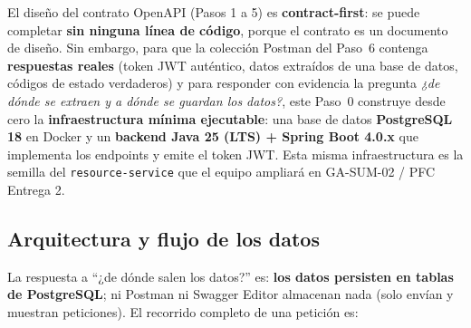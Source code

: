 \documentclass[11pt,a4paper]{article}
\begin{document}
\begin{cajanota}
El diseño del contrato OpenAPI (Pasos 1 a 5) es \textbf{contract-first}: se puede completar \textbf{sin ninguna línea de código}, porque el contrato es un documento de diseño. Sin embargo, para que la colección Postman del Paso~6 contenga \textbf{respuestas reales} (token JWT auténtico, datos extraídos de una base de datos, códigos de estado verdaderos) y para responder con evidencia la pregunta \textit{¿de dónde se extraen y a dónde se guardan los datos?}, este Paso~0 construye desde cero la \textbf{infraestructura mínima ejecutable}: una base de datos \textbf{PostgreSQL 18} en Docker y un \textbf{backend Java 25 (LTS) + Spring Boot 4.0.x} que implementa los endpoints y emite el token JWT. Esta misma infraestructura es la semilla del \texttt{resource-service} que el equipo ampliará en GA-SUM-02 / PFC Entrega 2.
\end{cajanota}

\subsection{Arquitectura y flujo de los datos}

La respuesta a ``¿de dónde salen los datos?'' es: \textbf{los datos persisten en tablas de PostgreSQL}; ni Postman ni Swagger Editor almacenan nada (solo envían y muestran peticiones). El recorrido completo de una petición es:

\begin{center}
\end{center}
\end{document}
